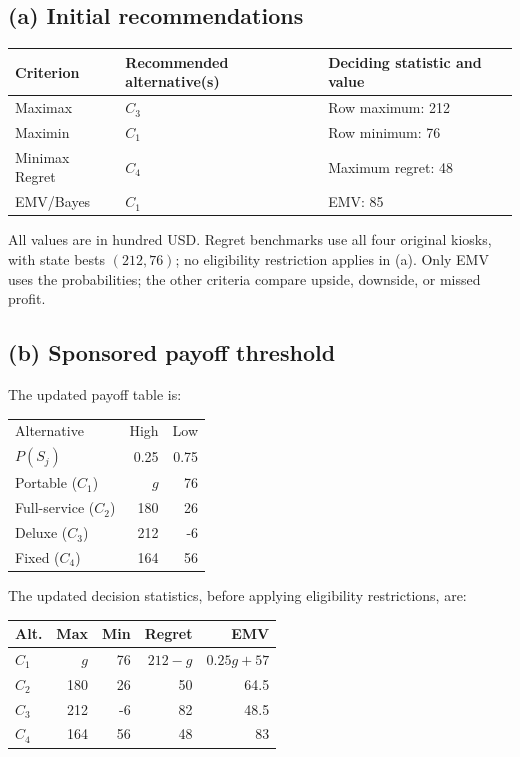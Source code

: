 \subsection*{(a) Initial recommendations }
\begin{center}
\begin{tabular}{lll}\toprule
Criterion & Recommended alternative(s) & Deciding statistic and value\\ \midrule
		Maximax & $C_3$ & Row maximum: 212\\
		Maximin & $C_1$ & Row minimum: 76\\
		Minimax Regret & $C_4$ & Maximum regret: 48\\
		EMV/Bayes & $C_1$ & EMV: 85\\
		\bottomrule\end{tabular}
\end{center}
All values are in hundred USD. Regret benchmarks use all four original kiosks, with state bests $(212,76)$; no eligibility restriction applies in (a). Only EMV uses the probabilities; the other criteria compare upside, downside, or missed profit.
\secInicio[sec:q2]



\label{sol:q2b}
\subsection*{(b) Sponsored payoff threshold }

The updated payoff table is:

\begin{center}\small\setlength{\tabcolsep}{4pt}
	\begin{tabular}{lrr}\toprule
		Alternative & High & Low\\
		$P(S_j)$ & 0.25 & 0.75\\ \midrule
				Portable ($C_1$) & $g$ & 76\\
		Full-service ($C_2$) & 180 & 26\\
		Deluxe ($C_3$) & 212 & -6\\
		Fixed ($C_4$) & 164 & 56\\
		\bottomrule
	\end{tabular}
\end{center}

The updated decision statistics, before applying
eligibility restrictions, are:

\begin{center}\small\setlength{\tabcolsep}{4pt}
	\begin{tabular}{lrrrr}\toprule
		Alt. & Max & Min & Regret & EMV\\ \midrule
				$C_1$ & $g$ & 76 & $212-g$ & $0.25g+57$\\
		$C_2$ & 180 & 26 & 50 & 64.5\\
		$C_3$ & 212 & -6 & 82 & 48.5\\
		$C_4$ & 164 & 56 & 48 & 83\\
		\bottomrule
	\end{tabular}
\end{center}

